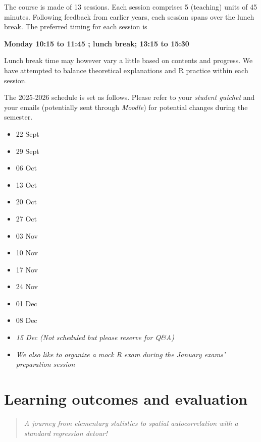 \documentclass[
  letterpaper,
  DIV=11,
  numbers=noendperiod]{scrreprt}
\providecommand{\tightlist}{%
  \setlength{\itemsep}{0pt}\setlength{\parskip}{0pt}}\usepackage{longtable,booktabs,array}
\begin{document}
The course is made of 13 sessions. Each session comprises 5 (teaching)
units of 45 minutes. Following feedback from earlier years, each session
spans over the lunch break. The preferred timing for each session is

\textbf{Monday 10:15 to 11:45 ; lunch break; 13:15 to 15:30}

Lunch break time may however vary a little based on contents and
progress. We have attempted to balance theoretical explanations and R
practice within each session.

The 2025-2026 schedule is set as follows. Please refer to your
\emph{student guichet} and your emails (potentially sent through
\emph{Moodle}) for potential changes during the semester.

\begin{itemize}
\tightlist
\item
  22 Sept
\item
  29 Sept
\item
  06 Oct
\item
  13 Oct
\item
  20 Oct
\item
  27 Oct
\item
  03 Nov
\item
  10 Nov
\item
  17 Nov
\item
  24 Nov
\item
  01 Dec
\item
  08 Dec
\item
  \emph{15 Dec (Not scheduled but please reserve for Q\&A)}
\item
  \emph{We also like to organize a mock R exam during the January exams'
  preparation session}
\end{itemize}


\chapter*{Learning outcomes and
evaluation}\label{sec-learning-outcomes-and-evaluation}


\begin{quote}
\emph{A journey from elementary statistics to spatial autocorrelation
with a standard regression detour!}
\end{quote}
\end{document}

